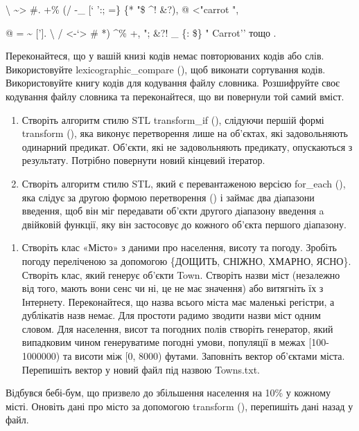 \documentclass[]{article}
\makeatletter
\newcommand{\xslalph}[1]{\expandafter\@xslalph\csname c@#1\endcsname}
\newcommand{\@xslalph}[1]{%
    \ifcase#1\or а\or б\or в\or г\or д\or e\or є\or ж\or з\or i%
    \or й\or к\or л\or м\or н\or о\or п\or р\or с\or т%
    \or у\or ф\or х\or ц\or ч\or ш\or ю\or я\or аа\or бб\or вв%
    \else\@ctrerr\fi%
}
\makeatother
\begin{document}
\begin{enumerate}
\begin{enumerate}[label=\xslalph*)]
\begin{enumerate}
\begin{enumerate}[label=\xslalph*)]
\textbar{}{]} \textbackslash{} \textasciitilde{}\textgreater{} \#. +\%
(/ -\_ {[}` ':; =\} \{* "\$ \^{}! \&?), @ \textless{}"carrot ",

@ = \textasciitilde{} {[}'{]}. \textbackslash{} /
\textless{}-`\textgreater{} \# *) \^{}\% +, "; \&?! \_ \{: \textbar{}
\$\} " Carrot'' тощо .

Переконайтеся, що у вашій книзі кодів немає повторюваних кодів або слів.
Використовуйте lexicographic\_compare (), щоб виконати сортування кодів.
Використовуйте книгу кодів для кодування файлу словника. Розшифруйте
своє кодування файлу словника та переконайтеся, що ви повернули той
самий вміст.

\begin{enumerate}
\def\labelenumi{\arabic{enumi})}
\item
  Створіть алгоритм стилю STL transform\_if (), слідуючи першій формі
  transform (), яка виконує перетворення лише на об'єктах, які
  задовольняють одинарний предикат. Об'єкти, які не задовольняють
  предикату, опускаються з результату. Потрібно повернути новий кінцевий
  ітератор.
\item
  Створіть алгоритм стилю STL, який є перевантаженою версією for\_each
  (), яка слідує за другою формою перетворення () і займає два діапазони
  введення, щоб він міг передавати об'єкти другого діапазону введення a
  двійковій функції, яку він застосовує до кожного об'єкта першого
  діапазону.
\end{enumerate}

\protect\hypertarget{_Hlk65952131}{}{}

\begin{enumerate}
\def\labelenumi{\arabic{enumi})}
\item
  Створіть клас «Місто» з даними про населення, висоту та погоду.
  Зробіть погоду переліченою за допомогою \{ДОЩИТЬ, СНІЖНО, ХМАРНО,
  ЯСНО\}. Створіть клас, який генерує об'єкти Town. Створіть назви міст
  (незалежно від того, мають вони сенс чи ні, це не має значення) або
  витягніть їх з Інтернету. Переконайтеся, що назва всього міста має
  маленькі регістри, а дублікатів назв немає. Для простоти радимо
  зводити назви міст одним словом. Для населення, висот та погодних
  полів створіть генератор, який випадковим чином генеруватиме погодні
  умови, популяції в межах {[}100-1000000) та висоти між {[}0, 8000)
  футами. Заповніть вектор об'єктами міста. Перепишіть вектор у новий
  файл під назвою Towns.txt.
\end{enumerate}

Відбувся бебі-бум, що призвело до збільшення населення на 10\% у кожному
місті. Оновіть дані про місто за допомогою transform (), перепишіть дані
назад у файл.


\end{enumerate}
\end{enumerate}
\end{enumerate}
\end{enumerate}
\end{document}
